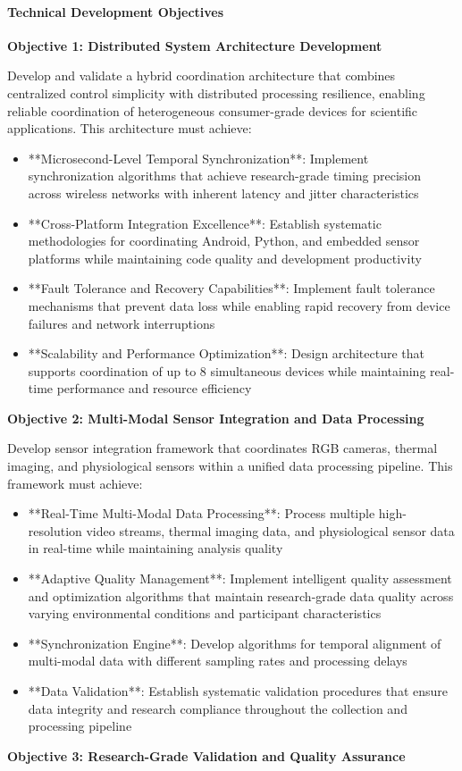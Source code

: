 \documentclass[11pt,a4paper]{article}
\begin{document}
\paragraph{Technical Development Objectives}

\textbf{Objective 1: Distributed System Architecture Development}

Develop and validate a hybrid coordination architecture that combines centralized
control simplicity with distributed
processing resilience, enabling reliable coordination of heterogeneous consumer-grade
devices for scientific
applications. This architecture must achieve:

\begin{itemize}
\item **Microsecond-Level Temporal Synchronization**: Implement synchronization algorithms that achieve
  research-grade timing precision across wireless networks with inherent latency and
  jitter characteristics
\item **Cross-Platform Integration Excellence**: Establish systematic methodologies for coordinating Android, Python, and
  embedded sensor platforms while maintaining code quality and development productivity
\item **Fault Tolerance and Recovery Capabilities**: Implement fault tolerance mechanisms that prevent data
  loss while enabling rapid recovery from device failures and network interruptions
\item **Scalability and Performance Optimization**: Design architecture that supports coordination of up to 8 simultaneous
  devices while maintaining real-time performance and resource efficiency

\end{itemize}
\textbf{Objective 2: Multi-Modal Sensor Integration and Data Processing}

Develop sensor integration framework that coordinates RGB cameras, thermal
imaging, and physiological
sensors within a unified data processing pipeline. This framework must achieve:

\begin{itemize}
\item **Real-Time Multi-Modal Data Processing**: Process multiple high-resolution video streams, thermal imaging data, and
  physiological sensor data in real-time while maintaining analysis quality
\item **Adaptive Quality Management**: Implement intelligent quality assessment and optimization algorithms that maintain
  research-grade data quality across varying environmental conditions and participant
  characteristics
\item **Synchronization Engine**: Develop algorithms for temporal alignment of multi-modal data with
  different sampling rates and processing delays
\item **Data Validation**: Establish systematic validation procedures that ensure data integrity and research
  compliance throughout the collection and processing pipeline

\end{itemize}
\textbf{Objective 3: Research-Grade Validation and Quality Assurance}
\end{document}
